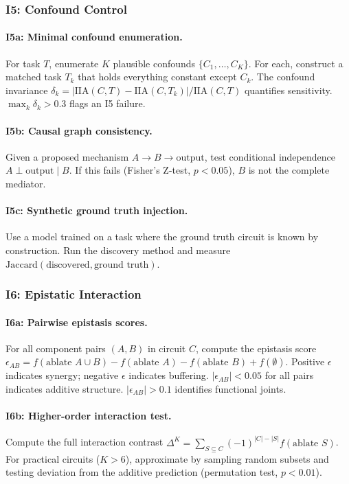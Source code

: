 \documentclass{article}
\begin{document}
\subsubsection{I5: Confound Control}

\paragraph{I5a: Minimal confound enumeration.} For task $T$, enumerate $K$ plausible confounds $\{C_1, \ldots, C_K\}$. For each, construct a matched task $T_k$ that holds everything constant except $C_k$. The confound invariance $\delta_k = |\text{IIA}(C, T) - \text{IIA}(C, T_k)| / \text{IIA}(C, T)$ quantifies sensitivity. $\max_k \delta_k > 0.3$ flags an I5 failure.

\paragraph{I5b: Causal graph consistency.} Given a proposed mechanism $A \to B \to \text{output}$, test conditional independence $A \perp \text{output} \mid B$. If this fails (Fisher's Z-test, $p < 0.05$), $B$ is not the complete mediator.

\paragraph{I5c: Synthetic ground truth injection.} Use a model trained on a task where the ground truth circuit is known by construction. Run the discovery method and measure $\text{Jaccard}(\text{discovered}, \text{ground truth})$.

\subsubsection{I6: Epistatic Interaction}

\paragraph{I6a: Pairwise epistasis scores.} For all component pairs $(A, B)$ in circuit $C$, compute the epistasis score $\epsilon_{AB} = f(\text{ablate } A \cup B) - f(\text{ablate } A) - f(\text{ablate } B) + f(\emptyset)$. Positive $\epsilon$ indicates synergy; negative $\epsilon$ indicates buffering. $|\epsilon_{AB}| < 0.05$ for all pairs indicates additive structure. $|\epsilon_{AB}| > 0.1$ identifies functional joints.

\paragraph{I6b: Higher-order interaction test.} Compute the full interaction contrast $\Delta^K = \sum_{S \subseteq C} (-1)^{|C|-|S|} f(\text{ablate } S)$. For practical circuits ($K > 6$), approximate by sampling random subsets and testing deviation from the additive prediction (permutation test, $p < 0.01$).
\end{document}
